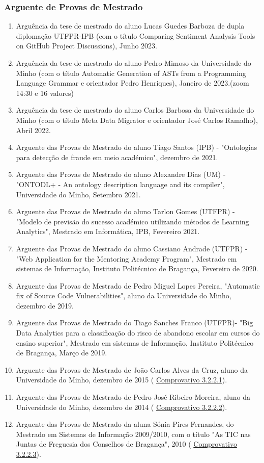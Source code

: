 \documentclass[11pt]{article}
\begin{document}
\subsubsection{Arguente de Provas de Mestrado}
\begin{enumerate}
\item{Arguência da tese de mestrado do aluno Lucas Guedes Barboza de dupla diplomação UTFPR-IPB (com o título Comparing Sentiment Analysis Tools on GitHub Project Discussions), Junho 2023.}
\item{Arguência da tese de mestrado do aluno Pedro Mimoso da Universidade do Minho (com o título Automatic Generation of ASTs from a Programming Language Grammar e orientador Pedro Henriques), Janeiro de 2023.(zoom 14:30 e 16 valores)}
\item{Arguência da tese de mestrado do aluno Carlos Barbosa da Universidade do Minho (com o título Meta Data Migrator e orientador José Carlos Ramalho), Abril 2022.}
\item{Arguente das Provas de Mestrado do aluno Tiago Santos (IPB) - "Ontologias para detecção de fraude em meio académico", dezembro de 2021.}
\item{Arguente das Provas de Mestrado do aluno Alexandre Dias (UM) - "ONTODL+ - An ontology description language and its compiler", Universidade do Minho, Setembro 2021.}
\item{Arguente das Provas de Mestrado do aluno Tarlon Gomes (UTFPR) - "Modelo de previsão do sucesso académico utilizando métodos de Learning Analytics", Mestrado em Informática, IPB, Fevereiro 2021.}
\item{Arguente das Provas de Mestrado do aluno Cassiano Andrade (UTFPR) - "Web Application for the Mentoring Academy Program", Mestrado em sistemas de Informação, Instituto Politécnico de Bragança, Fevereiro de 2020.}
\item{Arguente das Provas de Mestrado de Pedro Miguel Lopes Pereira, "Automatic fix of Source Code Vulnerabilities", aluno da Universidade do Minho, dezembro de 2019.}
\item{Arguente das Provas de Mestrado do Tiago Sanches Franco (UTFPR)- "Big Data Analytics para a classificação do risco de abandono escolar em cursos do ensino superior", Mestrado em sistemas de Informação, Instituto Politécnico de Bragança, Março de 2019.}
\item{Arguente das Provas de Mestrado de João Carlos Alves da Cruz, aluno da Universidade do Minho, dezembro de 2015 (
\href{run:JuriProvas/ArguenteJoaoCruz.pdf}{Comprovativo 3.2.2.1}).}
\item{Arguente das Provas de Mestrado de Pedro José Ribeiro Moreira, aluno da Universidade do Minho, dezembro de 2014 (
\href{run:JuriProvas/ArguentePedroMoreira.pdf}{Comprovativo 3.2.2.2}).}
\item{Arguente das Provas de Mestrado da aluna Sónia Pires Fernandes, do Mestrado em Sistemas de Informação 2009/2010, com o título "As TIC nas Juntas de Freguesia dos Conselhos de Bragança", 2010 (
\href{run:JuriProvas/ArguenteSoniaPires.pdf}{Comprovativo 3.2.2.3}).}
\end{enumerate}
\end{document}
